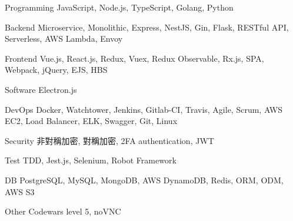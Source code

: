 

\begin{cvskills}

  \cvskill
    {Programming} %
    {JavaScript, Node.js, TypeScript, Golang, Python} %

  \cvskill
    {Backend} %
    {Microservice, Monolithic, Express, NestJS, Gin, Flask, RESTful API, Serverless, AWS Lambda, Envoy} %

  \cvskill
    {Frontend} %
    {Vue.js, React.js, Redux, Vuex, Redux Observable, Rx.js, SPA, Webpack, jQuery, EJS, HBS} %

  \cvskill
    {Software} %
    {Electron.js} %

  \cvskill
    {DevOps} %
    {Docker, Watchtower, Jenkins, Gitlab-CI, Travis, Agile, Scrum, AWS EC2, Load Balancer, ELK, Swagger, Git, Linux} %

  \cvskill
    {Security} %
    {非對稱加密, 對稱加密, 2FA authentication, JWT} %

  \cvskill
    {Test} %
    {TDD, Jest.js, Selenium, Robot Framework} %

  \cvskill
    {DB} %
    {PostgreSQL, MySQL, MongoDB, AWS DynamoDB, Redis, ORM, ODM, AWS S3} %

  \cvskill
    {Other} %
    {Codewars level 5, noVNC } %

\end{cvskills}
